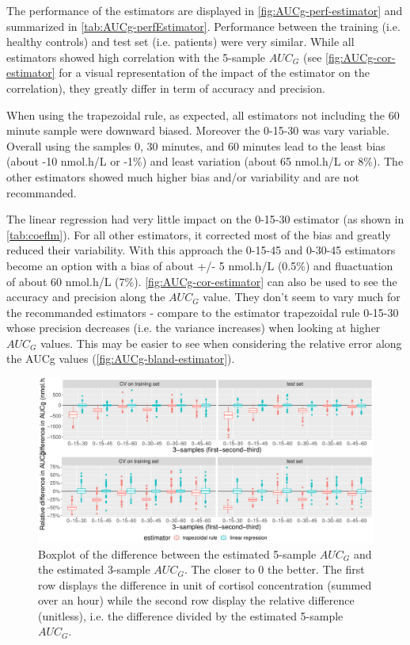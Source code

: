 \documentclass[12pt]{article}
\begin{document}
\bigskip

The performance of the estimators are displayed in
\autoref{fig:AUCg-perf-estimator} and summarized in
\autoref{tab:AUCg-perfEstimator}. Performance between the training
(i.e. healthy controls) and test set (i.e. patients) were very
similar.  While all estimators showed high correlation with the
5-sample \(AUC_G\) (see \autoref{fig:AUCg-cor-estimator} for a visual
representation of the impact of the estimator on the correlation),
they greatly differ in term of accuracy and precision.

\bigskip

When using the trapezoidal rule, as expected, all estimators not
including the 60 minute sample were downward biased. Moreover the
0-15-30 was vary variable. Overall using the samples 0, 30 minutes,
and 60 minutes lead to the least bias (about -10 nmol.h/L or -1\%) and
least variation (about 65 nmol.h/L or 8\%). The other estimators
showed much higher bias and/or variability and are not recommanded.

\bigskip

The linear regression had very little impact on the 0-15-30 estimator
(as shown in \autoref{tab:coeflm}). For all other estimators, it
corrected most of the bias and greatly reduced their variability. With
this approach the 0-15-45 and 0-30-45 estimators become an option with
a bias of about +/- 5 nmol.h/L (0.5\%) and fluactuation of about 60
nmol.h/L (7\%). \autoref{fig:AUCg-cor-estimator} can also be used to see
the accuracy and precision along the \(AUC_G\) value. They don't seem
to vary much for the recommanded estimators - compare to the estimator
trapezoidal rule 0-15-30 whose precision decreases (i.e. the variance
increases) when looking at higher \(AUC_G\) values. This may be easier
to see when considering the relative error along the AUCg values
(\autoref{fig:AUCg-bland-estimator}).

\begin{figure}[!h]
\centering
\includegraphics[width=1\textwidth]{./figures/AUCg-perf-boxplot.pdf}
\caption{\label{fig:AUCg-perf-estimator}Boxplot of the difference between the estimated 5-sample \(AUC_G\) and the estimated 3-sample \(AUC_G\). The closer to 0 the better. The first row displays the difference in unit of cortisol concentration (summed over an hour) while the second row display the relative difference (unitless), i.e. the difference divided by the estimated 5-sample \(AUC_G\).}
\end{figure}
\end{document}
